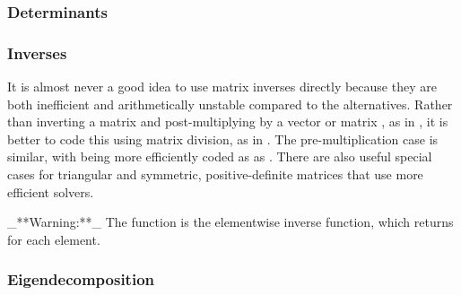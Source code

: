 \begin{description}
{\begin{description}
\begin{description}  \end{description}


\subsubsection{Determinants}


\begin{description}   \end{description}


\subsubsection{Inverses}


It is almost never a good idea to use matrix inverses directly because they are both inefficient and arithmetically unstable compared to the alternatives.  Rather than inverting a matrix  and post-multiplying by a vector or matrix , as in , it is better to code this using matrix division, as in .  The pre-multiplication case is similar, with  being more efficiently coded as as .  There are also useful special cases for triangular and symmetric, positive-definite matrices that use more efficient solvers.


 _**Warning:**_   The function  is the elementwise inverse function, which returns  for each element.


\begin{description}   \end{description}


\subsubsection{Eigendecomposition}


\begin{description}   \end{description}



\end{description}}
\end{description}
